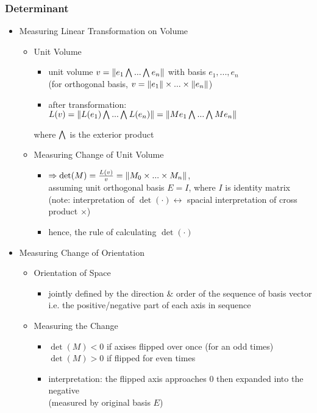 \subsubsection{Determinant}
\begin{itemize}
\item Measuring Linear Transformation on Volume
	\begin{itemize}
	\item Unit Volume
		\begin{itemize}
		\item unit volume $v=\norm{e_1 \extp ...\extp e_n}$ with basis $e_1,...,e_n$ \\
		(for orthogonal basis, $v=\lVert e_1\rVert\times...\times\lVert e_n\rVert$)
		\item after transformation: $L(v) = \norm{L(e_1)\extp...\extp L(e_n)} = \norm{Me_1\extp...\extp Me_n}$
		\end{itemize}
		where $\extp$ is the exterior product
	\item Measuring Change of Unit Volume
		\begin{itemize}
		\item $\Rightarrow \det(M) = \frac {L(v)}{v} = \lVert M_0\times...\times M_n\rVert$, \\
		assuming unit orthogonal basis $E=I$, where $I$ is identity matrix \\
		(note: interpretation of $\det(\cdot) \leftrightarrow$ spacial interpretation of cross product $\times$)
		\item hence, the rule of calculating $\det(\cdot)$ \\
		\end{itemize}
	\end{itemize}
	
\item Measuring Change of Orientation
	\begin{itemize}
	\item Orientation of Space
		\begin{itemize}
		\item jointly defined by the direction \& order of the sequence of basis vector \\
		i.e. the positive/negative part of each axis in sequence
		\end{itemize}
	\item Measuring the Change
		\begin{itemize}
		\item $\det(M) < 0$ if axises flipped over once (for an odd times) \\
		$\det(M) > 0$ if flipped for even times
		\item interpretation: the flipped axis approaches $0$ then expanded into the negative \\
		(measured by original basis $E$)
		\end{itemize}
	\end{itemize}
	

\end{itemize}
